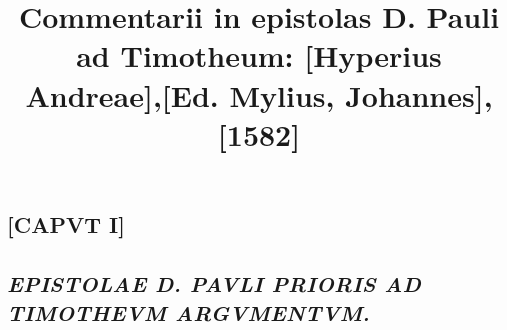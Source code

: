 \documentclass{article}
\begin{document}
\date{}
        \title{Commentarii in epistolas D. Pauli ad Timotheum: [Hyperius Andreae],[Ed. Mylius, Johannes], [1582]}
\maketitle
\tableofcontents
\clearpage
\begin{pages} 
\beginnumbering        
\marginpar{[ p.1 ]}
\section{[CAPVT I]}
\subsection*{\textit{EPISTOLAE D. PAVLI PRIORIS AD TIMOTHEVM ARGVMENTVM.}}

\end{pages}
\end{document}

